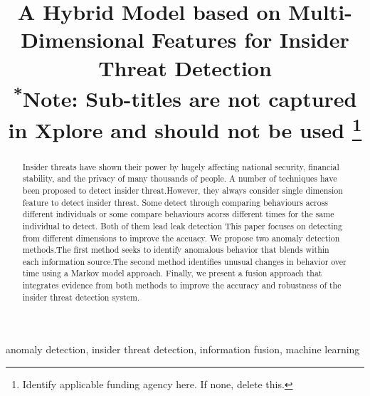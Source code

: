 \documentclass[conference]{IEEEtran}
\begin{document}
\title{A Hybrid Model based on Multi-Dimensional Features for Insider Threat Detection\\
{\footnotesize \textsuperscript{*}Note: Sub-titles are not captured in Xplore and
should not be used}
\thanks{Identify applicable funding agency here. If none, delete this.}
}

\author{
\and
{}

}

\maketitle

\begin{abstract}

Insider threats have shown their power by hugely affecting national security, financial stability, and the privacy of many thousands of people.
A number of techniques have been proposed to detect insider threat.However, they always consider single dimension feature to detect insider threat. Some detect through comparing  behaviours across different individuals or some compare behaviours acorss different times for the same individual to detect. Both of them lead leak detection
This paper focuses on detecting from different dimensions to improve the accuacy.
We propose two anomaly detection methods.The first method seeks to identify anomalous behavior that blends within each information source.The second method identifies unusual changes in behavior over time using a Markov model approach. Finally, we present a fusion approach that integrates evidence from both methods to improve the accuracy and robustness of the insider threat detection system. 
\end{abstract}

\begin{IEEEkeywords}
anomaly detection, insider threat detection, information fusion, machine learning
\end{IEEEkeywords}
\end{document}
